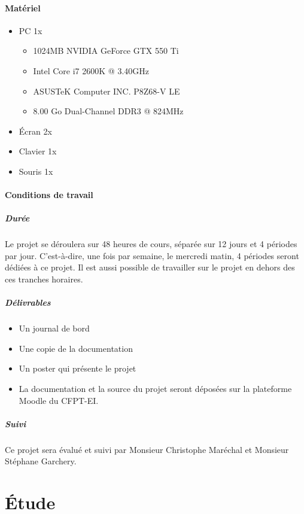 \documentclass[11pt, a4paper, oneside]{article}
\begin{document}
\subsection{Matériel}
\begin{itemize}
\item PC 1x
	\begin{itemize}
	\item 1024MB NVIDIA GeForce GTX 550 Ti
	\item Intel Core i7 2600K @ 3.40GHz
	\item ASUSTeK Computer INC. P8Z68-V LE
	\item 8.00 Go Dual-Channel DDR3 @ 824MHz
	\end{itemize}
\item Écran 2x
\item Clavier 1x
\item Souris 1x
\end{itemize}
\subsection{Conditions de travail}
\subsubsection{Durée}
Le projet se déroulera sur 48 heures de cours, séparée sur 12 jours et 4 périodes par jour. C'est-à-dire, une fois par semaine, le mercredi matin, 4 périodes seront dédiées à ce projet. Il est aussi possible de travailler sur le projet en dehors des ces tranches horaires.
\subsubsection{Délivrables}
\begin{itemize}
\item Un journal de bord
\item Une copie de la documentation
\item Un poster qui présente le projet
\item La documentation et la source du projet seront déposées sur la plateforme Moodle du CFPT-EI.
\end{itemize}
\subsubsection{Suivi}
Ce projet sera évalué et suivi par Monsieur Christophe Maréchal et Monsieur Stéphane Garchery.
\newpage
\part{Étude}
\newpage
\end{document}

